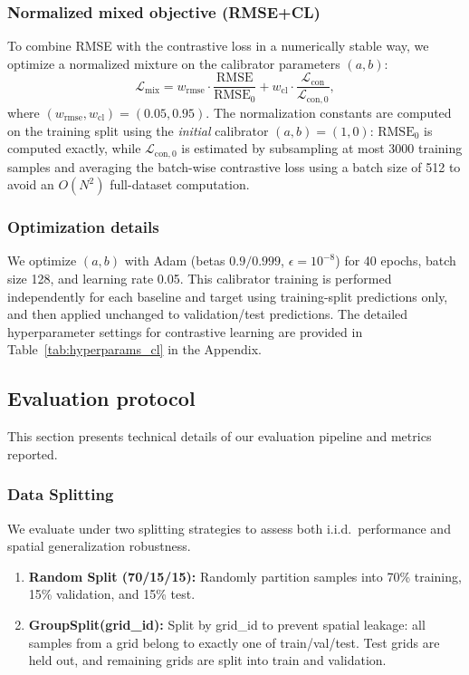 \documentclass[preprint,12pt]{elsarticle}
\begin{document}
\subsubsection{Normalized mixed objective (RMSE+CL)}
To combine RMSE with the contrastive loss in a numerically stable way, we optimize a normalized mixture on the calibrator parameters $(a,b)$:
\begin{equation}
\mathcal{L}_{\mathrm{mix}}
= w_{\mathrm{rmse}} \cdot \frac{\mathrm{RMSE}}{\mathrm{RMSE}_0}
+ w_{\mathrm{cl}}\cdot \frac{\mathcal{L}_{\mathrm{con}}}{\mathcal{L}_{\mathrm{con},0}},
\end{equation}
where $(w_{\mathrm{rmse}},w_{\mathrm{cl}})=(0.05,0.95)$. The normalization constants are computed on the training split using the \emph{initial} calibrator $(a,b)=(1,0)$: $\mathrm{RMSE}_0$ is computed exactly, while $\mathcal{L}_{\mathrm{con},0}$ is estimated by subsampling at most 3000 training samples and averaging the batch-wise contrastive loss using a batch size of 512 to avoid an $O(N^2)$ full-dataset computation.

\subsubsection{Optimization details}
We optimize $(a,b)$ with Adam (betas $0.9/0.999$, $\epsilon=10^{-8}$) for 40 epochs, batch size 128, and learning rate 0.05. This calibrator training is performed independently for each baseline and target using training-split predictions only, and then applied unchanged to validation/test predictions. The detailed hyperparameter settings for contrastive learning are provided in Table~\ref{tab:hyperparams_cl} in the Appendix.

\subsection{Evaluation protocol}

This section presents technical details of our evaluation pipeline and metrics reported.

\label{sec:eval_protocol}

\subsubsection{Data Splitting}
\label{sec:data_splitting}

We evaluate under two splitting strategies to assess both i.i.d.\ performance and spatial generalization robustness.
\begin{enumerate}
    \item \textbf{Random Split (70/15/15):} Randomly partition samples into 70\% training, 15\% validation, and 15\% test.
    \item \textbf{GroupSplit(grid\_id):} Split by grid\_id to prevent spatial leakage: all samples from a grid belong to exactly one of train/val/test. Test grids are held out, and remaining grids are split into train and validation.
\end{enumerate}
\end{document}
